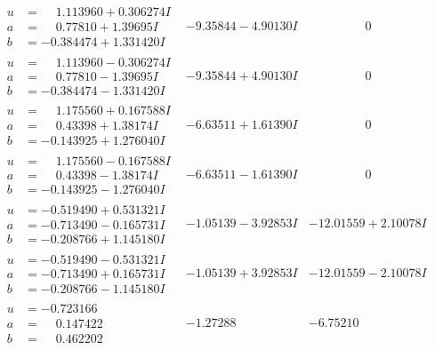 \documentclass[1p]{elsarticle_modified}
\theoremstyle{definition}
\begin{document}
$$\begin{array}{c|c|c}
\begin{aligned}
u &= \phantom{-}1.113960 + 0.306274 I \\
a &= \phantom{-}0.77810 + 1.39695 I \\
b &= -0.384474 + 1.331420 I\end{aligned}
 & -9.35844 - 4.90130 I & \phantom{-0.000000 } 0 \\ \hline\begin{aligned}
u &= \phantom{-}1.113960 - 0.306274 I \\
a &= \phantom{-}0.77810 - 1.39695 I \\
b &= -0.384474 - 1.331420 I\end{aligned}
 & -9.35844 + 4.90130 I & \phantom{-0.000000 } 0 \\ \hline\begin{aligned}
u &= \phantom{-}1.175560 + 0.167588 I \\
a &= \phantom{-}0.43398 + 1.38174 I \\
b &= -0.143925 + 1.276040 I\end{aligned}
 & -6.63511 + 1.61390 I & \phantom{-0.000000 } 0 \\ \hline\begin{aligned}
u &= \phantom{-}1.175560 - 0.167588 I \\
a &= \phantom{-}0.43398 - 1.38174 I \\
b &= -0.143925 - 1.276040 I\end{aligned}
 & -6.63511 - 1.61390 I & \phantom{-0.000000 } 0 \\ \hline\begin{aligned}
u &= -0.519490 + 0.531321 I \\
a &= -0.713490 - 0.165731 I \\
b &= -0.208766 + 1.145180 I\end{aligned}
 & -1.05139 - 3.92853 I & -12.01559 + 2.10078 I \\ \hline\begin{aligned}
u &= -0.519490 - 0.531321 I \\
a &= -0.713490 + 0.165731 I \\
b &= -0.208766 - 1.145180 I\end{aligned}
 & -1.05139 + 3.92853 I & -12.01559 - 2.10078 I \\ \hline\begin{aligned}
u &= -0.723166\phantom{ +0.000000I} \\
a &= \phantom{-}0.147422\phantom{ +0.000000I} \\
b &= \phantom{-}0.462202\phantom{ +0.000000I}\end{aligned}
 & -1.27288\phantom{ +0.000000I} & -6.75210\phantom{ +0.000000I} \\ \hline\begin{aligned}

\end{aligned}
\end{array}$$
\end{document}

